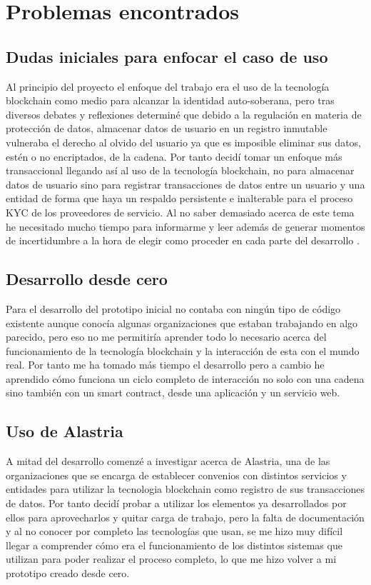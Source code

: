 \documentclass[12pt]{report}
\begin{document}
\section{Problemas encontrados}
\subsection{Dudas iniciales para enfocar el caso de uso}
Al principio del proyecto el enfoque del trabajo era el uso de la tecnología blockchain como medio para alcanzar la identidad auto-soberana, pero tras diversos debates y reflexiones determiné que debido a la regulación en materia de protección de datos, almacenar datos de usuario en un registro inmutable vulneraba el derecho al olvido del usuario ya que es imposible eliminar sus datos, estén o no encriptados, de la cadena. Por tanto decidí tomar un enfoque más transaccional llegando así al uso de la tecnología blockchain, no para almacenar datos de usuario sino para registrar transacciones de datos entre un usuario y una entidad de forma que haya un respaldo persistente e inalterable para el proceso KYC de los proveedores de servicio. Al no saber demasiado acerca de este tema he necesitado mucho tiempo para informarme y leer además de generar momentos de incertidumbre a la hora de elegir como proceder en cada parte del desarrollo
.
\subsection{Desarrollo desde cero}
Para el desarrollo del prototipo inicial no contaba con ningún tipo de código existente aunque conocía algunas organizaciones que estaban trabajando en algo parecido, pero eso no me permitiría aprender todo lo necesario acerca del funcionamiento de la tecnología blockchain y la interacción de esta con el mundo real. Por tanto me ha tomado más tiempo el desarrollo pero a cambio he aprendido cómo funciona un ciclo completo de interacción no solo con una cadena sino también con un smart contract, desde una aplicación y un servicio web.
\subsection{Uso de Alastria}
A mitad del desarrollo comenzé a investigar acerca de Alastria, una de las organizaciones que se encarga de establecer convenios con distintos servicios y entidades para utilizar la tecnologia blockchain como registro de sus transacciones de datos. Por tanto decidí probar a utilizar los elementos ya desarrollados por ellos para aprovecharlos y quitar carga de trabajo, pero la falta de documentación y al no conocer por completo las tecnologías que usan, se me hizo muy difícil llegar a comprender cómo era el funcionamiento de los distintos sistemas que utilizan para poder realizar el proceso completo, lo que me hizo volver a mi prototipo creado desde cero.
\end{document}
